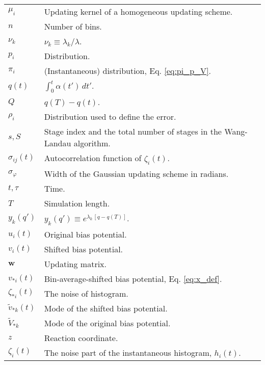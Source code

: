 \documentclass[reprint, superscriptaddress, floatfix]{revtex4-1}
\begin{document}
{\begin{table*}
\begin{tabular}{l | p{12cm} }
    $\mu_i$         &   Updating kernel of a homogeneous updating scheme. \\
    $n$             &   Number of bins. \\
    $\nu_k$         &   $\nu_k \equiv \lambda_k / \lambda$. \\
    $p_i$           &   Distribution. \\
    $\pi_i$         &   (Instantaneous) distribution, Eq. \eqref{eq:pi_p_V}. \\
    $q(t)$          &   $\int_0^t \alpha(t') \, dt'$.  \\
    $Q$             &   $q(T) - q(t)$.  \\
    $\rho_i$        &   Distribution used to define the error. \\
    $s, S$          &   Stage index and the total number of stages in the Wang-Landau algorithm. \\
    $\sigma_{ij}(t)$   &   Autocorrelation function of $\zeta_i(t)$. \\
    $\sigma_\varphi$   &   Width of the Gaussian updating scheme in radians. \\
    $t, \tau$       &   Time. \\
    $T$             &   Simulation length. \\
    $y_k(q')$       &   $y_k(q') \equiv e^{\lambda_k \, [q - q(T)]}$. \\
    $u_i(t)$        &   Original bias potential. \\
    $v_i(t)$        &   Shifted bias potential. \\
    $\mathbf w$     &   Updating matrix. \\
    $v_{*i}(t)$        &   Bin-average-shifted bias potential, Eq. \eqref{eq:x_def}. \\
    $\zeta_{*i}(t)$      &   The noise of histogram. \\
    ${\tilde v}_{*k}(t)$        &   Mode of the shifted bias potential. \\
    ${\tilde V}_{*k}$           &   Mode of the original bias potential. \\
    $z$             &   Reaction coordinate. \\
    $\zeta_i(t)$    &   The noise part of the instantaneous histogram, $h_i(t)$.
  \end{tabular}
  \end{table*}
}


\end{document}
